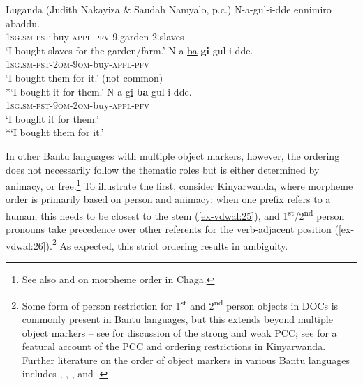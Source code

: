 \documentclass[output=paper
,modfonts
,nonflat]{langsci/langscibook}
\begin{document}
\begin{exe}
\ex Luganda (Judith Nakayiza \& Saudah Namyalo, p.c.)\label{ex-vdwal:24}
	\xlist
	\ex
		\gll N-a-gul-i-dde ennimiro abaddu.\\
		\textsc{1sg.sm-pst}-buy-\textsc{appl-pfv} 9.garden 2.slaves\\
		\glt `I bought slaves for the garden/farm.'
	\ex 
		\gll N-a-\uline{ba}-\textbf{gi}-gul-i-dde.\\
		\textsc{1sg.sm-pst-2om-9om}-buy-\textsc{appl-pfv}\\
		\glt `I bought them for it.' (not common)\\
		*`I bought it for them.'
	\ex 	
		\gll N-a-\uline{gi}-\textbf{ba}-gul-i-dde.\\
		\textsc{1sg.sm-pst-9om-2om}-buy-\textsc{appl-pfv}\\
		\glt `I bought it for them.'\\	
		*`I bought them for it.'
	\endxlist
\end{exe}
In other Bantu languages with multiple object markers, however, the ordering does not necessarily follow the thematic roles but is either determined by animacy, or free.\footnote{See also \citet{Bresnan_Moshi1990} and \citet{Alsina1996} on morpheme order in Chaga.} To illustrate the first, consider Kinyarwanda, where morpheme order is primarily based on person and animacy: when one prefix refers to a human, this needs to be closest to the stem (\ref{ex-vdwal:25}), and 1\textsuperscript{st}/2\textsuperscript{nd} person pronouns take precedence over other referents for the verb-adjacent position (\ref{ex-vdwal:26}).\footnote{Some form of person restriction for 1\textsuperscript{st} and 2\textsuperscript{nd} person objects in DOCs is commonly present in Bantu languages, but this extends beyond multiple object markers -- see \citet{Riedel2009} for discussion of the strong and weak PCC; see \citet{Yokoyama2016} for a featural account of the PCC and ordering restrictions in Kinyarwanda. Further literature on the order of object markers in various Bantu languages includes \citet{Duranti1979}, \citet{Bresnan_Moshi1990}, \citet{Rugemalira1993}, and \citet{Alsina1996}.} As expected, this strict ordering results in ambiguity.
\end{document}
